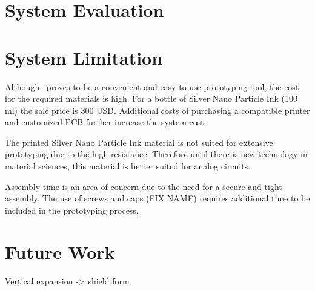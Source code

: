 \section{System Evaluation}

\section{System Limitation}
Although \papertitle\ proves to be a convenient and easy to use prototyping tool, the cost for the required materials is high. For a bottle of Silver Nano Particle Ink (100 ml) the sale price is 300 USD. Additional costs of purchasing a compatible printer and customized \papertitle PCB further increase the system cost.

The printed Silver Nano Particle Ink material is not suited for extensive prototyping due to the high resistance. Therefore until there is new technology in material sciences, this material is better suited for analog circuits.

Assembly time is an area of concern due to the need for a secure and tight assembly. The use of screws and caps (FIX NAME) requires additional time to be included in the prototyping process.

\section{Future Work}
Vertical expansion -> shield form